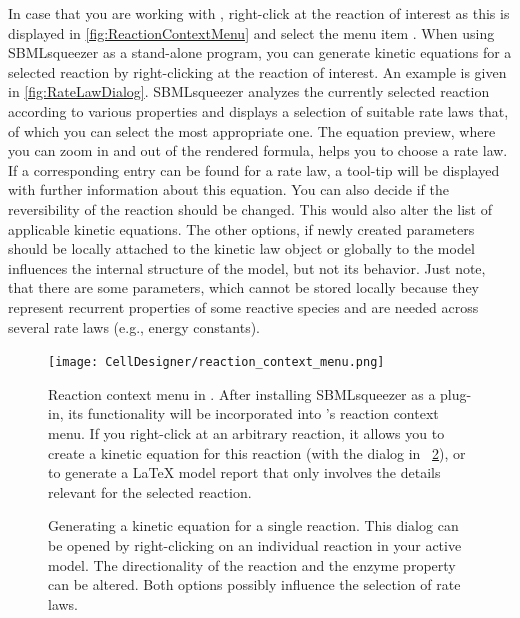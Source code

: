 In case that you are working with \CellDesigner, right-click at the reaction of interest as this is displayed in \vref{fig:ReactionContextMenu} and select the menu item .
When using SBMLsqueezer as a stand-alone program, you can generate kinetic equations for a selected reaction by right-clicking at the reaction of interest.
An example is given in \vref{fig:RateLawDialog}.
SBMLsqueezer analyzes the currently selected reaction according to various properties
and displays a selection of suitable rate laws that, of which you can select
the most appropriate one. The equation preview, where you can zoom in and out
of the rendered formula, helps you to choose a rate law. If a corresponding
\SBO entry can be found for a rate law, a tool-tip will be displayed with further
information about this equation.
You can also decide if the reversibility of the reaction should be changed.
This would also alter the list of applicable kinetic equations.
The other options, if newly created
parameters should be locally attached to the kinetic law object or globally to
the model influences the internal structure of the model, but not its behavior.
Just note, that there are some parameters, which cannot be stored locally because
they represent recurrent properties of some reactive species and are needed
across several rate laws (e.g., energy constants).
\begin{figure}
\texttt{[image: CellDesigner/reaction\_context\_menu.png]}
\caption[Reaction context menu in \CellDesigner]{Reaction context menu in \CellDesigner.
After installing SBMLsqueezer as a plug-in, its functionality will be incorporated into \CellDesigner's reaction context menu.
If you right-click at an arbitrary reaction, it allows you to create a kinetic equation for this reaction (with the  dialog in ~\ref{fig:RateLawDialog}), or to generate a \LaTeX{} model report that only involves the details relevant for the selected reaction.}
\label{fig:ReactionContextMenu}
\end{figure}
\begin{figure}[b!]
\caption[Generating a kinetic equation for a single reaction]{Generating a kinetic equation for a single reaction.
This dialog can be opened by right-clicking on an individual reaction in your active model.
The directionality of the reaction and the enzyme property can be altered.
Both options possibly influence the selection of rate laws.}
\label{fig:RateLawDialog}
\end{figure}

